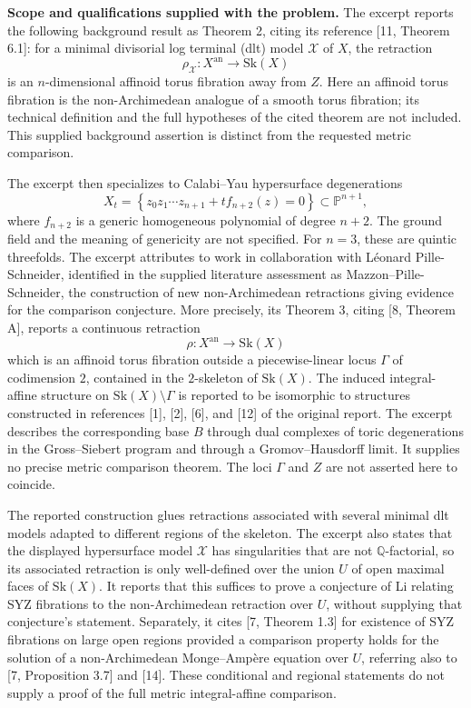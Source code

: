 \documentclass[11pt]{article}
\newcommand{\Q}{\mathbb{Q}}
\newcommand{\PP}{\mathbb{P}}
\begin{document}
\textbf{Scope and qualifications supplied with the problem.}
The excerpt reports the following background result as Theorem 2, citing its reference [11, Theorem 6.1]: for a minimal divisorial log terminal (dlt) model \(\mathcal X\) of \(X\), the retraction
\[
\rho_{\mathcal X}:X^{\mathrm{an}}\longrightarrow\mathrm{Sk}(X)
\]
is an \(n\)-dimensional affinoid torus fibration away from \(Z\). Here an affinoid torus fibration is the non-Archimedean analogue of a smooth torus fibration; its technical definition and the full hypotheses of the cited theorem are not included. This supplied background assertion is distinct from the requested metric comparison.

The excerpt then specializes to Calabi--Yau hypersurface degenerations
\[
X_t=\left\{z_0z_1\cdots z_{n+1}+t f_{n+2}(z)=0\right\}\subset\PP^{n+1},
\]
where \(f_{n+2}\) is a generic homogeneous polynomial of degree \(n+2\). The ground field and the meaning of genericity are not specified. For \(n=3\), these are quintic threefolds. The excerpt attributes to work in collaboration with L\'eonard Pille-Schneider, identified in the supplied literature assessment as Mazzon--Pille-Schneider, the construction of new non-Archimedean retractions giving evidence for the comparison conjecture. More precisely, its Theorem 3, citing [8, Theorem A], reports a continuous retraction
\[
\rho:X^{\mathrm{an}}\longrightarrow\mathrm{Sk}(X)
\]
which is an affinoid torus fibration outside a piecewise-linear locus \(\Gamma\) of codimension \(2\), contained in the \(2\)-skeleton of \(\mathrm{Sk}(X)\). The induced integral-affine structure on \(\mathrm{Sk}(X)\setminus\Gamma\) is reported to be isomorphic to structures constructed in references [1], [2], [6], and [12] of the original report. The excerpt describes the corresponding base \(B\) through dual complexes of toric degenerations in the Gross--Siebert program and through a Gromov--Hausdorff limit. It supplies no precise metric comparison theorem. The loci \(\Gamma\) and \(Z\) are not asserted here to coincide.

The reported construction glues retractions associated with several minimal dlt models adapted to different regions of the skeleton. The excerpt also states that the displayed hypersurface model \(\mathcal X\) has singularities that are not \(\Q\)-factorial, so its associated retraction is only well-defined over the union \(U\) of open maximal faces of \(\mathrm{Sk}(X)\). It reports that this suffices to prove a conjecture of Li relating SYZ fibrations to the non-Archimedean retraction over \(U\), without supplying that conjecture's statement. Separately, it cites [7, Theorem 1.3] for existence of SYZ fibrations on large open regions provided a comparison property holds for the solution of a non-Archimedean Monge--Amp\`ere equation over \(U\), referring also to [7, Proposition 3.7] and [14]. These conditional and regional statements do not supply a proof of the full metric integral-affine comparison.
\end{document}
